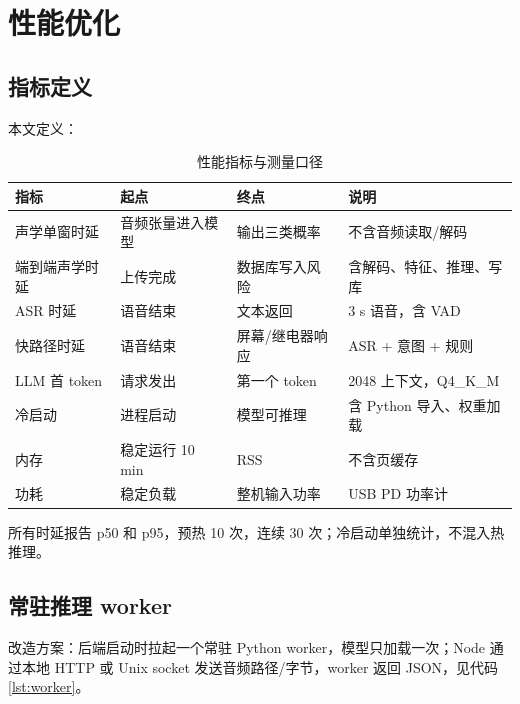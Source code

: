 \documentclass[UTF8,11pt,a4paper,fontset=none]{ctexart}
\begin{document}
\section{性能优化}
\label{sec:optimization}

\subsection{指标定义}

本文定义：

\begin{table}[H]
\centering
\small
\caption{性能指标与测量口径}
\label{tab:metrics}
\begin{tabular}{p{3.2cm}p{3.4cm}p{3.4cm}p{4.0cm}}
\toprule
指标 & 起点 & 终点 & 说明 \\
\midrule
声学单窗时延 & 音频张量进入模型 & 输出三类概率 & 不含音频读取/解码 \\
端到端声学时延 & 上传完成 & 数据库写入风险 & 含解码、特征、推理、写库 \\
ASR 时延 & 语音结束 & 文本返回 & 3 s 语音，含 VAD \\
快路径时延 & 语音结束 & 屏幕/继电器响应 & ASR + 意图 + 规则 \\
LLM 首 token & 请求发出 & 第一个 token & 2048 上下文，Q4\_K\_M \\
冷启动 & 进程启动 & 模型可推理 & 含 Python 导入、权重加载 \\
内存 & 稳定运行 10 min & RSS & 不含页缓存 \\
功耗 & 稳定负载 & 整机输入功率 & USB PD 功率计 \\
\bottomrule
\end{tabular}
\end{table}

所有时延报告 p50 和 p95，预热 10 次，连续 30 次；冷启动单独统计，不混入热推理。

\subsection{常驻推理 worker}

改造方案：后端启动时拉起一个常驻 Python worker，模型只加载一次；Node 通过本地 HTTP 或 Unix socket 发送音频路径/字节，worker 返回 JSON，见代码\ref{lst:worker}。
\end{document}
